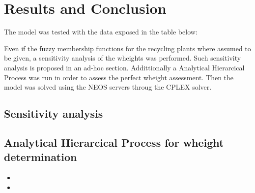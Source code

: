 \documentclass{article}
\begin{document}
\pagebreak

\section{Results and Conclusion}
The model was tested with the data exposed in the table below:

Even if the fuzzy membership functions for the recycling plants where assumed to be given, a sensitivity analysis of the wheights was performed. Such sensitivity analysis is proposed in an ad-hoc section. Addittionally a Analytical Hierarcical Process was run in order to assess the perfect wheight assessment. Then the model was solved using the NEOS servers throug the CPLEX solver. 

\subsection{Sensitivity analysis}

\subsection{Analytical Hierarcical Process for wheight determination}

\begin{itemize}
	\item
	\item
\end{itemize}


\newpage 

\printbibliography
\end{document}

